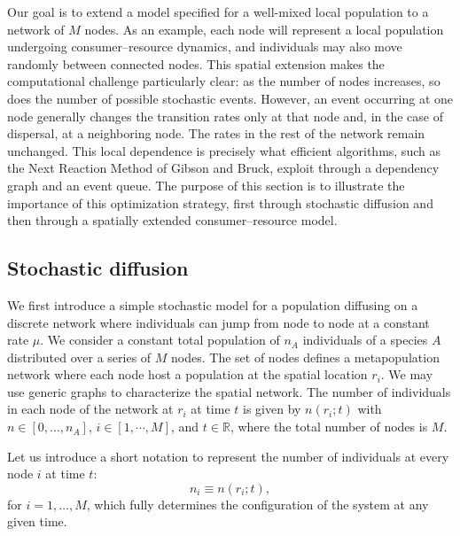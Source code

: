 \label{space}
Our goal is to extend a model specified for a well-mixed local population to a network of $M$ nodes. As an example, each node will represent a local population undergoing consumer--resource dynamics, and individuals may also move randomly between connected nodes. This spatial extension makes the computational challenge particularly clear: as the number of nodes increases, so does the number of possible stochastic events. However, an event occurring at one node generally changes the transition rates only at that node and, in the case of dispersal, at a neighboring node. The rates in the rest of the network remain unchanged. This local dependence is precisely what efficient algorithms, such as the Next Reaction Method of Gibson and Bruck, exploit through a dependency graph and an event queue. The purpose of this section is to illustrate the importance of this optimization strategy, first through stochastic diffusion and then through a spatially extended consumer--resource model.
\smallskip
   
\subsection*{{\bfseries Stochastic diffusion}}   
 We first introduce a simple stochastic model for a population diffusing on a discrete network where individuals can jump from node to node at a constant rate $\mu$. We consider a constant total population of $n_A$ individuals of a species $A$ distributed over a series of $M$ nodes. The set of nodes defines a metapopulation network where each node host a population at the spatial location $r_i$. We may use generic graphs to characterize the spatial network. The number of individuals in each node of the network at $r_i$ at time $t$ is given by $n(r_i;t)$ with $n \in [0, \dots, n_A]$, $i \in [1,\cdots,M]$, and $t \in \mathbb{R}$, where the total number of nodes is $M$.
\smallskip

Let us introduce a short notation to represent the number of individuals at every node $i$ at time $t$:
\begin{equation}
n_i \equiv n(r_i;t),
\label{eq:spatial_state}
\end{equation}
for $i=1, \dots, M$, which fully determines the configuration of the system at any given time. 
\smallskip

